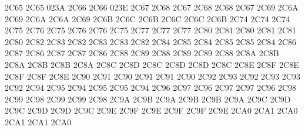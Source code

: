 \setcclcucx 2C65 2C65 023A %
\setcclcucx 2C66 2C66 023E %
\setcclcucx 2C67 2C68 2C67 %
\setcclcucx 2C68 2C68 2C67 %
\setcclcucx 2C69 2C6A 2C69 %
\setcclcucx 2C6A 2C6A 2C69 %
\setcclcucx 2C6B 2C6C 2C6B %
\setcclcucx 2C6C 2C6C 2C6B %
\setcclcucx 2C74 2C74 2C74 %
\setcclcucx 2C75 2C76 2C75 %
\setcclcucx 2C76 2C76 2C75 %
\setcclcucx 2C77 2C77 2C77 %
\setcclcucx 2C80 2C81 2C80 %
\setcclcucx 2C81 2C81 2C80 %
\setcclcucx 2C82 2C83 2C82 %
\setcclcucx 2C83 2C83 2C82 %
\setcclcucx 2C84 2C85 2C84 %
\setcclcucx 2C85 2C85 2C84 %
\setcclcucx 2C86 2C87 2C86 %
\setcclcucx 2C87 2C87 2C86 %
\setcclcucx 2C88 2C89 2C88 %
\setcclcucx 2C89 2C89 2C88 %
\setcclcucx 2C8A 2C8B 2C8A %
\setcclcucx 2C8B 2C8B 2C8A %
\setcclcucx 2C8C 2C8D 2C8C %
\setcclcucx 2C8D 2C8D 2C8C %
\setcclcucx 2C8E 2C8F 2C8E %
\setcclcucx 2C8F 2C8F 2C8E %
\setcclcucx 2C90 2C91 2C90 %
\setcclcucx 2C91 2C91 2C90 %
\setcclcucx 2C92 2C93 2C92 %
\setcclcucx 2C93 2C93 2C92 %
\setcclcucx 2C94 2C95 2C94 %
\setcclcucx 2C95 2C95 2C94 %
\setcclcucx 2C96 2C97 2C96 %
\setcclcucx 2C97 2C97 2C96 %
\setcclcucx 2C98 2C99 2C98 %
\setcclcucx 2C99 2C99 2C98 %
\setcclcucx 2C9A 2C9B 2C9A %
\setcclcucx 2C9B 2C9B 2C9A %
\setcclcucx 2C9C 2C9D 2C9C %
\setcclcucx 2C9D 2C9D 2C9C %
\setcclcucx 2C9E 2C9F 2C9E %
\setcclcucx 2C9F 2C9F 2C9E %
\setcclcucx 2CA0 2CA1 2CA0 %
\setcclcucx 2CA1 2CA1 2CA0 %
